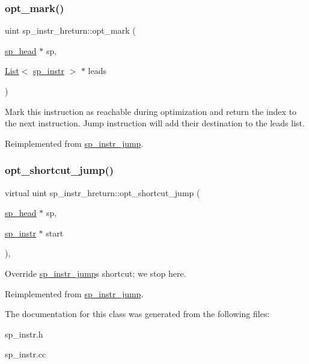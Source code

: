 \subsubsection{\texorpdfstring{opt\+\_\+mark()}{opt\_mark()}}
{\footnotesize\ttfamily uint sp\+\_\+instr\+\_\+hreturn\+::opt\+\_\+mark (\begin{DoxyParamCaption}\item[{\mbox{\hyperlink{classsp__head}{sp\+\_\+head}} $\ast$}]{sp,  }\item[{\mbox{\hyperlink{classList}{List}}$<$ \mbox{\hyperlink{classsp__instr}{sp\+\_\+instr}} $>$ $\ast$}]{leads }\end{DoxyParamCaption})\hspace{0.3cm}{\ttfamily [virtual]}}

Mark this instruction as reachable during optimization and return the index to the next instruction. Jump instruction will add their destination to the leads list. 

Reimplemented from \mbox{\hyperlink{classsp__instr__jump_a4daedb439c97a78adf9957fc35121dbe}{sp\+\_\+instr\+\_\+jump}}.

\mbox{\label{classsp__instr__hreturn_aad1c6b1378f1f2f26fb3be33622f0ce2}} 
\subsubsection{\texorpdfstring{opt\+\_\+shortcut\+\_\+jump()}{opt\_shortcut\_jump()}}
{\footnotesize\ttfamily virtual uint sp\+\_\+instr\+\_\+hreturn\+::opt\+\_\+shortcut\+\_\+jump (\begin{DoxyParamCaption}\item[{\mbox{\hyperlink{classsp__head}{sp\+\_\+head}} $\ast$}]{sp,  }\item[{\mbox{\hyperlink{classsp__instr}{sp\+\_\+instr}} $\ast$}]{start }\end{DoxyParamCaption})\hspace{0.3cm}{\ttfamily [inline]}, {\ttfamily [virtual]}}

Override \mbox{\hyperlink{classsp__instr__jump}{sp\+\_\+instr\+\_\+jump}}\textquotesingle{}s shortcut; we stop here. 

Reimplemented from \mbox{\hyperlink{classsp__instr__jump_a7c0f595bd9f39e9b38cc1e06333c3db0}{sp\+\_\+instr\+\_\+jump}}.



The documentation for this class was generated from the following files\+:\begin{DoxyCompactItemize}
\item 
sp\+\_\+instr.\+h\item 
sp\+\_\+instr.\+cc\end{DoxyCompactItemize}
